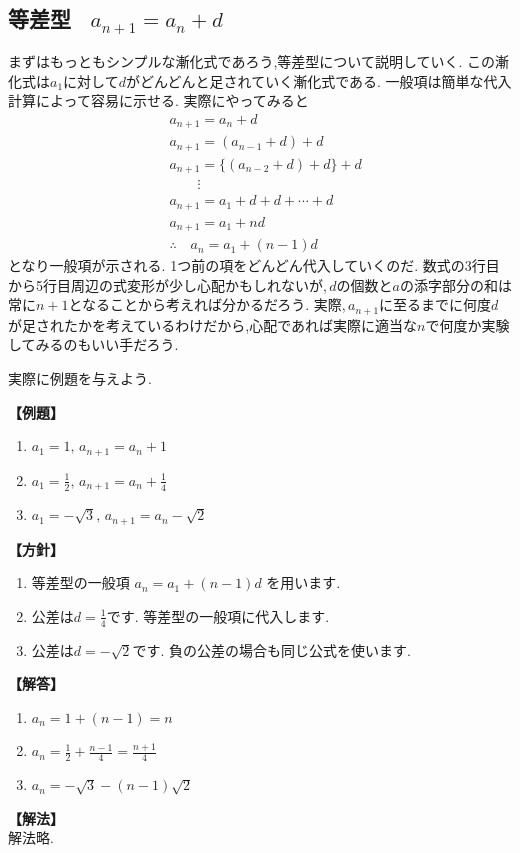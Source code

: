 
    \subsection{等差型 \, $a_{n+1}=a_n+d$}
      まずはもっともシンプルな漸化式であろう,等差型について説明していく.
      この漸化式は$a_1$に対して$d$がどんどんと足されていく漸化式である.
      一般項は簡単な代入計算によって容易に示せる.
      実際にやってみると
      \begin{align*}
        &a_{n+1}=a_n+d\\
        &a_{n+1}=(a_{n-1}+d)+d\\
        &a_{n+1}=\{(a_{n-2}+d)+d\}+d\\
        &\qquad \vdots\\
        &a_{n+1}=a_1+d+d+\cdots+d\\
        &a_{n+1}=a_1+nd\\
        &\therefore \quad a_n=a_1+(n-1)d
      \end{align*}
      となり一般項が示される.
      1つ前の項をどんどん代入していくのだ.
      数式の3行目から5行目周辺の式変形が少し心配かもしれないが,\,$d$の個数と$a$の添字部分の和は常に$n+1$となることから考えれば分かるだろう.
      実際,\,$a_{n+1}$に至るまでに何度$d$が足されたかを考えているわけだから,心配であれば実際に適当な$n$で何度か実験してみるのもいい手だろう.

      実際に例題を与えよう.

      \noindent \textbf{【例題】}
      \begin{enumerate}[label=(\arabic*),parsep=3pt]
        \item $\displaystyle a_1=1,\, a_{n+1}=a_n+1$
        \item $\displaystyle a_1=\frac{1}{2},\, a_{n+1}=a_n+\frac{1}{4}$
        \item $\displaystyle a_1=-\sqrt{3},\, a_{n+1}=a_n-\sqrt{2}$
      \end{enumerate}

      \noindent\textbf{【方針】}
      \begin{enumerate}[label=(\arabic*),parsep=3pt]
        \item 等差型の一般項
              $\displaystyle a_n=a_1+(n-1)d$
              を用います.
        \item 公差は$\displaystyle d=\frac14$です.
              等差型の一般項に代入します.
        \item 公差は$\displaystyle d=-\sqrt2$です.
              負の公差の場合も同じ公式を使います.
      \end{enumerate}

      \noindent\textbf{【解答】}
      \begin{enumerate}[label=(\arabic*),parsep=3pt]
        \item $\displaystyle a_n=1+(n-1)=n$
        \item $\displaystyle a_n=\frac12+\frac{n-1}{4}
              =\frac{n+1}{4}$
        \item $\displaystyle a_n=-\sqrt3-(n-1)\sqrt2$
      \end{enumerate}

      \noindent\textbf{【解法】}\\
      解法略.
